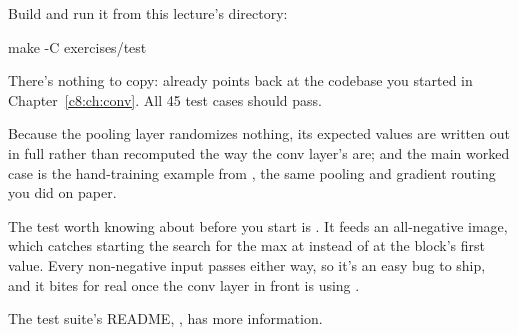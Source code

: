 Build and run it from this lecture's  directory:

\begin{shell}
make -C exercises/test
\end{shell}

\noindent There's nothing to copy:  already points back at the 
codebase you started in Chapter~\ref{c8:ch:conv}. All 45 test cases should pass.

Because the pooling layer randomizes nothing, its expected values are written out in full rather
than recomputed the way the conv layer's are; and the main worked case is the hand-training example
from , the same pooling and gradient routing you did on paper.

The test worth knowing about before you start is . It feeds
an all-negative image, which catches starting the search for the max at  instead of at
the block's first value. Every non-negative input passes either way, so it's an easy bug to ship,
and it bites for real once the conv layer in front is using .

The test suite's README, , has more
information.
